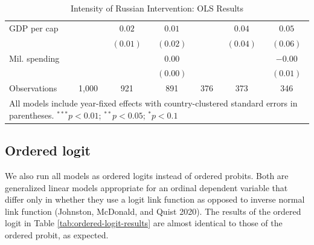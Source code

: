 \documentclass[
]{article}
\begin{document}
\begin{table}[h!]
\begin{center}
\begin{tabular}{l c c c c c c}
\quad GDP per cap     &               & $0.02$        & $0.01$        &               & $0.04$        & $0.05$        \\
                      &               & $(0.01)$      & $(0.02)$      &               & $(0.04)$      & $(0.06)$      \\
\quad Mil. spending   &               &               & $0.00$        &               &               & $-0.00$       \\
                      &               &               & $(0.00)$      &               &               & $(0.01)$      \\
\hline
Observations          & 1,000         & 921           & 891           & 376           & 373           & 346           \\
\hline
\multicolumn{7}{l}{\scriptsize{All models include year-fixed effects with country-clustered standard errors in parentheses. $^{***}p<0.01$; $^{**}p<0.05$; $^{*}p<0.1$}}
\end{tabular}
\caption{Intensity of Russian Intervention: OLS Results}
\label{tab:ols-results}
\end{center}
\end{table}

\hypertarget{ordered-logit}{%
\subsection{Ordered logit}\label{ordered-logit}}

We also run all models as ordered logits instead of ordered probits. Both are generalized linear models appropriate for an ordinal dependent variable that differ only in whether they use a logit link function as opposed to inverse normal link function (Johnston, McDonald, and Quist 2020). The results of the ordered logit in Table \ref{tab:ordered-logit-results} are almost identical to those of the ordered probit, as expected.
\end{document}
